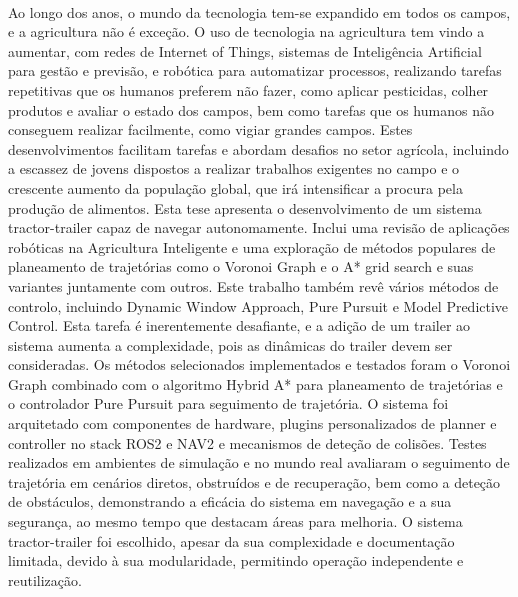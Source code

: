 
%

\paragraph{}Ao longo dos anos, o mundo da tecnologia tem-se expandido em todos os 
campos, e a agricultura não é exceção. O uso de tecnologia na agricultura tem vindo a aumentar, com redes de Internet of Things, sistemas de 
Inteligência Artificial para gestão e previsão, e robótica para automatizar processos, 
realizando tarefas repetitivas que os humanos preferem não fazer, como aplicar 
pesticidas, colher produtos e avaliar o estado dos campos, bem como tarefas que os 
humanos não conseguem realizar facilmente, como vigiar grandes campos. Estes 
desenvolvimentos facilitam tarefas e abordam desafios no 
setor agrícola, incluindo a escassez de jovens dispostos a realizar trabalhos exigentes 
no campo e o crescente aumento da população global, que irá intensificar a procura pela 
produção de alimentos. Esta tese apresenta o desenvolvimento de um sistema 
tractor-trailer capaz de navegar autonomamente. Inclui uma revisão de 
aplicações robóticas na Agricultura Inteligente e uma exploração de métodos populares de 
planeamento de trajetórias como o Voronoi Graph e o A* grid search e suas variantes juntamente com outros. Este 
trabalho também revê vários métodos de controlo, incluindo Dynamic Window Approach, 
Pure Pursuit e Model Predictive Control. Esta tarefa é inerentemente desafiante, e a 
adição de um trailer ao sistema aumenta a complexidade, pois as dinâmicas do trailer 
devem ser consideradas. Os métodos selecionados implementados e testados foram o Voronoi 
Graph combinado com o algoritmo Hybrid A* para planeamento de trajetórias e o controlador Pure 
Pursuit para seguimento de trajetória. O sistema foi arquitetado com componentes de 
hardware, plugins personalizados de planner e controller no stack ROS2 e NAV2 e 
mecanismos de deteção de colisões. Testes realizados em ambientes de simulação e 
no mundo real avaliaram o seguimento de trajetória em cenários diretos, obstruídos e de 
recuperação, bem como a deteção de obstáculos, demonstrando a eficácia do 
sistema em navegação e a sua segurança, ao mesmo tempo que destacam áreas para melhoria. 
O sistema tractor-trailer foi escolhido, apesar da sua complexidade e documentação 
limitada, devido à sua modularidade, permitindo operação independente e reutilização.


